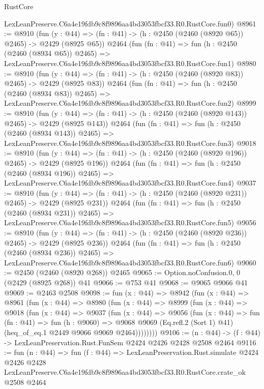 \begin{lexlean}{RustCore}
\begin{coremodule}
    LexLeanPreserve.C6a4e19fdb9c8f9896aa4bd3053fbcf33.R0.RustCore.fun0)
@8961 := @8910
    (fun (y : @44) => (fn : @41) -> (h : @2450 (@2460 (@8920 @65)) @2465) -> @2429 (@8925 @65))
    @2464
    (fun (fn : @41) =>
    fun (h : @2450 (@2460 (@8934 @65)) @2465) =>
    LexLeanPreserve.C6a4e19fdb9c8f9896aa4bd3053fbcf33.R0.RustCore.fun1)
@8980 := @8910
    (fun (y : @44) => (fn : @41) -> (h : @2450 (@2460 (@8920 @83)) @2465) -> @2429 (@8925 @83))
    @2464
    (fun (fn : @41) =>
    fun (h : @2450 (@2460 (@8934 @83)) @2465) =>
    LexLeanPreserve.C6a4e19fdb9c8f9896aa4bd3053fbcf33.R0.RustCore.fun2)
@8999 := @8910
    (fun (y : @44) => (fn : @41) -> (h : @2450 (@2460 (@8920 @143)) @2465) -> @2429 (@8925 @143))
    @2464
    (fun (fn : @41) =>
    fun (h : @2450 (@2460 (@8934 @143)) @2465) =>
    LexLeanPreserve.C6a4e19fdb9c8f9896aa4bd3053fbcf33.R0.RustCore.fun3)
@9018 := @8910
    (fun (y : @44) => (fn : @41) -> (h : @2450 (@2460 (@8920 @196)) @2465) -> @2429 (@8925 @196))
    @2464
    (fun (fn : @41) =>
    fun (h : @2450 (@2460 (@8934 @196)) @2465) =>
    LexLeanPreserve.C6a4e19fdb9c8f9896aa4bd3053fbcf33.R0.RustCore.fun4)
@9037 := @8910
    (fun (y : @44) => (fn : @41) -> (h : @2450 (@2460 (@8920 @231)) @2465) -> @2429 (@8925 @231))
    @2464
    (fun (fn : @41) =>
    fun (h : @2450 (@2460 (@8934 @231)) @2465) =>
    LexLeanPreserve.C6a4e19fdb9c8f9896aa4bd3053fbcf33.R0.RustCore.fun5)
@9056 := @8910
    (fun (y : @44) => (fn : @41) -> (h : @2450 (@2460 (@8920 @236)) @2465) -> @2429 (@8925 @236))
    @2464
    (fun (fn : @41) =>
    fun (h : @2450 (@2460 (@8934 @236)) @2465) =>
    LexLeanPreserve.C6a4e19fdb9c8f9896aa4bd3053fbcf33.R0.RustCore.fun6)
@9060 := @2450 (@2460 (@8920 @268)) @2465
@9065 := Option.noConfusion.{0, 0} (@2429 (@8925 @268)) @41
@9066 := @753 @41
@9068 := @9065 @9066 @41
@9069 := @2463 @2508
@9098 := fun (x : @44) =>
  @8942
    (fun (x : @44) =>
    @8961
      (fun (x : @44) =>
      @8980
        (fun (x : @44) =>
        @8999
          (fun (x : @44) =>
          @9018
            (fun (x : @44) =>
            @9037
              (fun (x : @44) =>
              @9056
                (fun (x : @44) =>
                fun (fn : @41) =>
                fun (h : @9060) =>
                @9068
                  @9069
                  (Eq.refl.{2} (Sort 1) @41)
                  (heq_of_eq.{1} @2449 @9066 @9069 @2464))))))))
@9106 := (n : @44) -> (f : @44) -> LexLeanPreservation.Rust.FunSem @2424 @2426 @2428 @2508 @2464
@9116 := fun (n : @44) =>
  fun (f : @44) =>
  LexLeanPreservation.Rust.simulate
    @2424
    @2426
    @2428
    LexLeanPreserve.C6a4e19fdb9c8f9896aa4bd3053fbcf33.R0.RustCore.crate_ok
    @2508
    @2464
\end{coremodule}
\end{lexlean}
